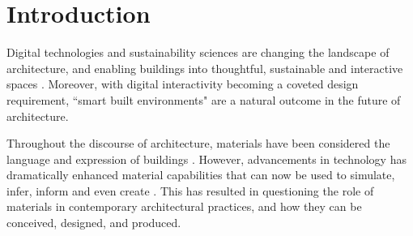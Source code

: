 \documentclass[manuscript, anonymous, review]{acmart}
\begin{document}



 
\maketitle

\section{Introduction}
Digital technologies and sustainability sciences are changing the landscape of architecture, and enabling buildings into thoughtful, sustainable and interactive spaces  \cite{kolarevic2004architecture}. Moreover, with digital interactivity becoming a coveted design requirement, ``smart built environments" are a natural outcome in the future of architecture. 

Throughout the discourse of architecture, materials have been considered the language and expression of buildings \cite{schropfer2012material}. However, advancements in technology has dramatically enhanced material capabilities that can now be used to simulate, infer, inform and even create \cite{schropfer2012material, kolarevic2004architecture}.  This has resulted in questioning the role of materials in contemporary architectural practices, and how they can be conceived, designed, and produced. 
\end{document}
